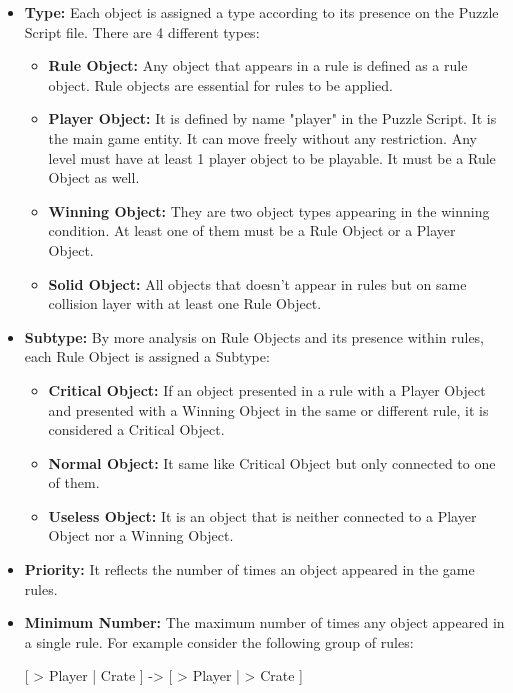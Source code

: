 \begin{itemize}
	\item \textbf{Type:} Each object is assigned a type according to its presence on the Puzzle Script file. There are 4 different types:
	\begin{itemize} \itemsep0pt \parskip0pt 
		\item \textbf{Rule Object:} Any object that appears in a rule is defined as a rule object. Rule objects are essential for rules to be applied.
		\item \textbf{Player Object:} It is defined by name "player" in the Puzzle Script. It is the main game entity. It can move freely without any restriction. Any level must have at least 1 player object to be playable. It must be a Rule Object as well.
		\item \textbf{Winning Object:} They are two object types appearing in the winning condition. At least one of them must be a Rule Object or a Player Object.
		\item \textbf{Solid Object:} All objects that doesn't appear in rules but on same collision layer with at least one Rule Object.
	\end{itemize}
	\item \textbf{Subtype:} By more analysis on Rule Objects and its presence within rules, each Rule Object is assigned a Subtype:
	\begin{itemize} \itemsep0pt \parskip0pt 
		\item \textbf{Critical Object:} If an object presented in a rule with a Player Object and presented with a Winning Object in the same or different rule, it is considered a Critical Object.
		\item \textbf{Normal Object:} It same like Critical Object but only connected to one of them.
		\item \textbf{Useless Object:} It is an object that is neither connected to a Player Object nor a Winning Object.
	\end{itemize}
	\item \textbf{Priority:} It reflects the number of times an object appeared in the game rules.
	\item \textbf{Minimum Number:} The maximum number of times any object appeared in a single rule. For example consider the following group of rules:
	\begin{center}
		[ > Player | Crate ] -> [ > Player | > Crate ]
	\end{center}
	\begin{center}

\end{center}
\end{itemize}
